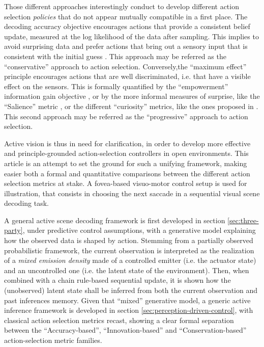 \documentclass[12pt,twoside,openright]{article}
\begin{document}
Those different approaches interestingly conduct to develop different 
action selection \emph{policies} 
that do not appear mutually compatible in a first place.
The decoding accuracy objective encourages actions that provide a consistent belief update, measured at the log likelihood of the data after sampling. This implies to avoid surprising data and prefer actions that bring out a sensory input that is consistent with the initial guess \citep{friston2010free}. This  approach may be referred as the ``conservative'' approach to action selection.  
Conversely,the ``maximum effect'' principle encourages actions that are well discriminated, i.e. that have a visible effect on the sensors. This is formally quantified by the ``empowerment'' information gain objective \citep{klyubin2005empowerment,tishby2011information}, %
or by the more informal measures of surprise, like the ``Salience'' metric \citep{itti2005bayesian}, or the
different ``curiosity'' metrics, like the ones proposed in \citet{schmidhuber1991curious,oudeyer2008can, pathak2017curiosity}. This second approach may be referred as the ``progressive'' approach to action selection. 

Active vision is thus in need for clarification, in order to develop more effective and principle-grounded action-selection controllers in open environments. This article is an attempt to set the ground for such a unifying framework, making easier both a formal and quantitative comparisons between the different action selection metrics at stake. A fovea-based visuo-motor control setup is used for illustration, that consists in choosing the next saccade in a sequential visual scene decoding task.
	
A general active scene decoding framework is first developed in section \ref{sec:three-party}, under predictive control assumptions, 
with a generative model explaining how the observed data is shaped by action. 
Stemming from a partially observed probabilistic framework, the current observation is interpreted as the realization of a \emph{mixed emission density} made of a controlled emitter (i.e. the actuator state) and an uncontrolled one (i.e. the latent state of the environment). Then, when combined with a chain rule-based sequential update, it is shown how the (unobserved) latent state shall be inferred from both the current observation and past inferences memory. Given that ``mixed'' generative model, a generic active inference framework is developed in section \ref{sec:perception-driven-control}, with classical action selection metrics recast, showing a clear formal separation between the ``Accuracy-based'', ``Innovation-based'' and ``Conservation-based'' action-selection metric families. 
\end{document}
